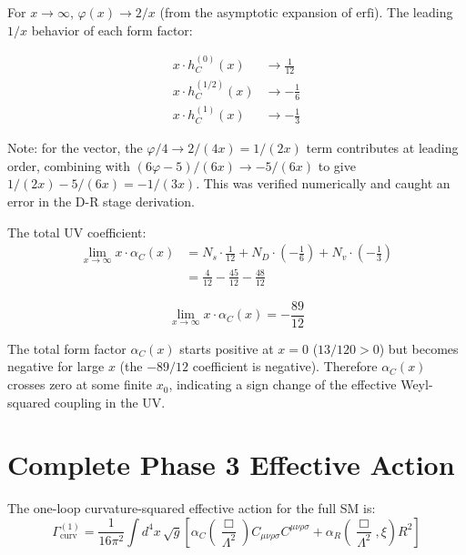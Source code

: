 \documentclass[11pt,a4paper]{article}
\begin{document}
For $x \to \infty$, $\varphi(x) \to 2/x$ (from the asymptotic expansion of
$\mathrm{erfi}$). The leading $1/x$ behavior of each form factor:

\begin{align}
  x \cdot h_C^{(0)}(x) &\to \frac{1}{12} \\
  x \cdot h_C^{(1/2)}(x) &\to -\frac{1}{6} \\
  x \cdot h_C^{(1)}(x) &\to -\frac{1}{3}
\end{align}

Note: for the vector, the $\varphi/4 \to 2/(4x) = 1/(2x)$ term contributes
at leading order, combining with $(6\varphi-5)/(6x) \to -5/(6x)$ to give
$1/(2x) - 5/(6x) = -1/(3x)$. This was verified numerically and caught an
error in the D-R stage derivation.

The total UV coefficient:
\begin{align}
  \lim_{x\to\infty} x \cdot \alpha_C(x) &= N_s \cdot \frac{1}{12} + N_D \cdot \left(-\frac{1}{6}\right) + N_v \cdot \left(-\frac{1}{3}\right) \nonumber \\
  &= \frac{4}{12} - \frac{45}{12} - \frac{48}{12}
\end{align}

\begin{equation}
  \boxed{\lim_{x\to\infty} x \cdot \alpha_C(x) = -\frac{89}{12}}
  \label{eq:uv-asymptotic}
\end{equation}

The total form factor $\alpha_C(x)$ starts positive at $x=0$ ($13/120 > 0$)
but becomes negative for large $x$ (the $-89/12$ coefficient is negative).
Therefore $\alpha_C(x)$ crosses zero at some finite $x_0$, indicating a sign
change of the effective Weyl-squared coupling in the UV.

\section{Complete Phase 3 Effective Action}

The one-loop curvature-squared effective action for the full SM is:
\begin{equation}
  \Gamma^{(1)}_{\mathrm{curv}} = \frac{1}{16\pi^2}\int d^4x\,\sqrt{g}\left[
    \alpha_C\!\left(\frac{\Box}{\Lambda^2}\right)\!C_{\mu\nu\rho\sigma}C^{\mu\nu\rho\sigma}
    + \alpha_R\!\left(\frac{\Box}{\Lambda^2},\xi\right)\!R^2
  \right]
\end{equation}
\end{document}
